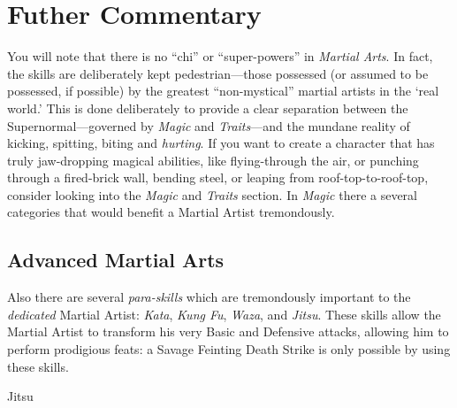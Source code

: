 
\section{Futher Commentary}

You will note that there is no ``chi'' or ``super-powers'' in
\emph{Martial Arts}. In fact, the skills are deliberately kept
pedestrian---those possessed (or assumed to be possessed, if possible)
by the greatest ``non-mystical'' martial artists in the `real world.'
This is done deliberately to provide a clear separation between the
Supernormal---governed by \emph{Magic} and \emph{Traits}---and the
mundane reality of kicking, spitting, biting and \textsl{hurting}. If
you want to create a character that has truly jaw-dropping magical
abilities, like flying-through the air, or punching through a
fired-brick wall, bending steel, or leaping from roof-top-to-roof-top,
consider looking into the \emph{Magic} and \emph{Traits} section. In
\emph{Magic} there a several categories that would benefit a Martial
Artist tremondously.

\subsection{Advanced Martial Arts}
\label{sec:adv-ma}

Also there are several \emph{para-skills} which are tremondously
important to the \textsl{dedicated} Martial Artist: \emph{Kata},
\emph{Kung Fu}, \emph{Waza}, and \emph{Jitsu}. These skills allow the
Martial Artist to transform his very Basic and Defensive attacks,
allowing him to perform prodigious feats: a Savage Feinting Death
Strike is only possible by using these skills.

\begin{description}
\item[Jitsu] 
\end{description}